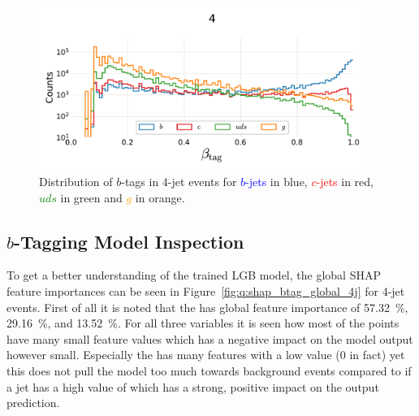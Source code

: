 \begin{figure}[h!]
  \centerfloat
  \includegraphics[width=0.95\textwidth, trim=15 15 15 50, clip]{figures/quarks/btag_scores_histogram_-njet=4-down_sample=1.00-ML_vars=vertex-selection=b-ejet_min=4-n_iter_RS_lgb=99-n_iter_RS_xgb=9-cdot_cut=0.90-version=19.pdf}
  \caption[Distribution of $b$-Tags in 4-Jet Events]
          {Distribution of $b$-tags in 4-jet events for \textcolor{blue}{$b$-jets} in blue, \textcolor{red}{$c$-jets} in red, \textcolor{green}{$uds$} in green and \textcolor{orange}{$g$} in orange.} 
  \label{fig:q:btag_histogram_4j}
\end{figure}


\subsection{$b$-Tagging Model Inspection}

To get a better understanding of the trained LGB model, the global SHAP feature importances can be seen in Figure~\ref{fig:q:shap_btag_global_4j} for 4-jet events. First of all it is noted that the  has global feature importance of \SI{57.32}{\percent},  \SI{29.16}{\percent}, and  \SI{13.52}{\percent}. For all three variables it is seen how most of the points have many small feature values which has a negative impact on the model output however small. Especially the  has many features with a low value (\num{0} in fact) yet this does not pull the model too much towards background events compared to if a jet has a high value of  which has a strong, positive impact on the output prediction.

